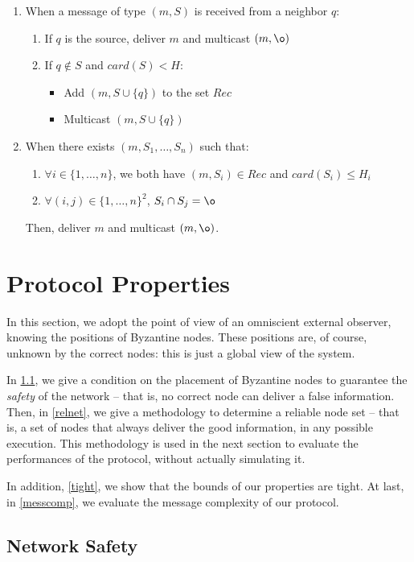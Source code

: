 \documentclass[a4paper,11pt]{article}
\begin{document}
\begin{enumerate}
\item When a message of type $(m,S)$ is received from a neighbor $q$:
\begin{enumerate}
\item If $q$ is the source, deliver $m$ and multicast $(m,\o)$
\item If $q \notin S$ and $card(S) < H$:
\begin{itemize}
\item Add $(m, S \cup \{q\})$ to the set $Rec$
\item Multicast $(m, S \cup \{q\})$
\end{itemize}
\end{enumerate}

\item When there exists $(m,S_1,\dots,S_n)$ such that:
\begin{enumerate}
\item $\forall i \in \{1,\dots,n\}$, we both have $(m,S_i)\in Rec$ and $card(S_i) \leq H_i$
\item $\forall (i,j) \in \{1,\dots,n\}^2$, $S_i \cap S_j = \o$
\end{enumerate}
Then, deliver $m$ and multicast $(m,\o)$.
\end{enumerate}

\section{Protocol Properties}
\label{sec_prop}

In this section, we adopt the point of view of an omniscient external observer, knowing the positions of Byzantine nodes. These positions are, of course, unknown by the correct nodes: this is just a global view of the system.

In \ref{safenet}, we give a condition on the placement of Byzantine nodes to guarantee the \emph{safety} of the network -- that is, no correct node can deliver a false information. Then, in \ref{relnet}, we give a methodology to determine a reliable node set -- that is, a set of nodes that always deliver the good information, in any possible execution. This methodology is used in the next section to evaluate the performances of the protocol, without actually simulating it.

In addition, \ref{tight}, we show that the bounds of our properties are tight.
At last, in \ref{messcomp}, we evaluate the message complexity of our protocol.

\subsection{Network Safety}
\label{safenet}
\end{document}
